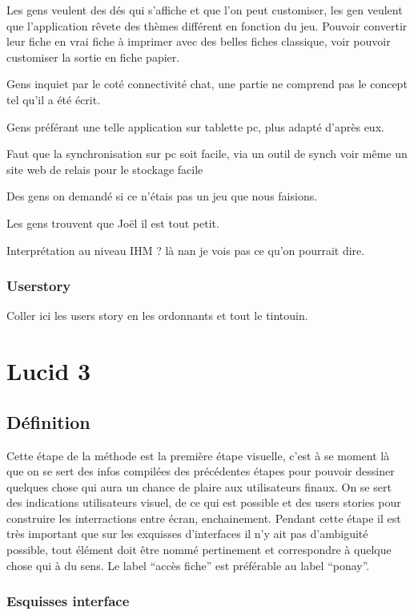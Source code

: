 \documentclass[11pt,a4paper]{report}
\begin{document}
Les gens veulent des dés qui s'affiche et que l'on peut customiser, les gen
veulent que l'application rêvete des thèmes différent en fonction du jeu.
Pouvoir convertir leur fiche en vrai fiche à imprimer avec des belles fiches
classique, voir pouvoir customiser la sortie en fiche papier.

Gens inquiet par le coté connectivité chat, une partie ne comprend pas le
concept tel qu'il a été écrit.


Gens préférant une telle application sur tablette pc, plus adapté d'après eux.

Faut que la synchronisation sur pc soit facile, via un outil de synch
voir même un site web de relais pour le stockage facile

Des gens on demandé si ce n'étais pas un jeu que nous faisions.

Les gens trouvent que Joël il est tout petit.

Interprétation au niveau IHM ? là nan je vois pas ce qu'on pourrait dire.

\subsubsection{Userstory}

Coller ici les users story en les ordonnants et tout le tintouin.


\section{Lucid 3}

\subsection{Définition}

Cette étape de la méthode est la première étape visuelle, c'est à se moment là
que on se sert des infos compilées des précédentes étapes pour pouvoir dessiner
quelques chose qui aura un chance de plaire aux utilisateurs finaux.
On se sert des indications utilisateurs visuel, de ce qui est possible et des
users stories pour construire les interractions entre écran, enchainement.
Pendant cette étape il est très important que sur les exquisses d'interfaces il
n'y ait pas d'ambiguité possible, tout élément doit être nommé pertinement et
correspondre à quelque chose qui à du sens. Le label ``accès fiche'' est
préférable au label ``ponay''. 


\subsubsection{Esquisses interface}
\end{document}
